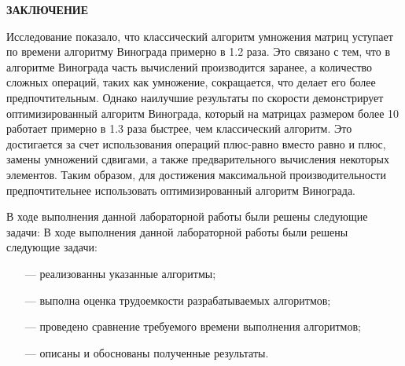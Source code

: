 \begin{center}
    \textbf{ЗАКЛЮЧЕНИЕ}
\end{center}

Исследование показало, что классический алгоритм умножения матриц уступает по времени алгоритму Винограда примерно в 1.2 раза. Это связано с тем, что в алгоритме Винограда часть вычислений производится заранее, а количество сложных операций, таких как умножение, сокращается, что делает его более предпочтительным. Однако наилучшие результаты по скорости демонстрирует оптимизированный алгоритм Винограда, который на матрицах размером более 10 работает примерно в 1.3 раза быстрее, чем классический алгоритм. Это достигается за счет использования операций плюс-равно вместо равно и плюс, замены умножений сдвигами, а также предварительного вычисления некоторых элементов. Таким образом, для достижения максимальной производительности предпочтительнее использовать оптимизированный алгоритм Винограда.

\vspace{5mm}

В ходе выполнения данной лабораторной работы были решены следующие задачи:
В ходе выполнения данной лабораторной работы были решены следующие задачи:
\begin{itemize}
    \item[---] реализованны указанные алгоритмы;
    \item[---] выполна оценка трудоемкости разрабатываемых алгоритмов;
    \item[---] проведено сравнение требуемого времени выполнения алгоритмов;
    \item[---] описаны и обоснованы полученные результаты.
\end{itemize}
